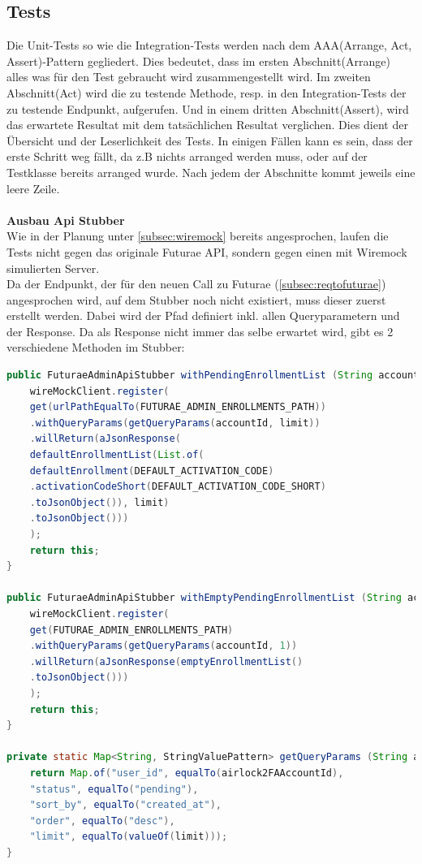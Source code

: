 \subsection{Tests}\label{subsec:testbackend}
Die Unit-Tests so wie die Integration-Tests werden nach dem AAA(Arrange, Act, Assert)-Pattern gegliedert. Dies bedeutet, dass im ersten Abschnitt(Arrange) alles was für den Test gebraucht wird zusammengestellt wird. Im zweiten Abschnitt(Act) wird die zu testende Methode, resp. in den Integration-Tests der zu testende Endpunkt, aufgerufen. Und in einem dritten Abschnitt(Assert), wird das erwartete Resultat mit dem tatsächlichen Resultat verglichen. Dies dient der Übersicht und der Leserlichkeit des Tests. In einigen Fällen kann es sein, dass der erste Schritt weg fällt, da z.B nichts arranged werden muss, oder auf der Testklasse bereits arranged wurde. Nach jedem der Abschnitte kommt jeweils eine leere Zeile. \\
\\
\textbf{Ausbau Api Stubber}\label{head:stubber}\\
Wie in der Planung unter \ref{subsec:wiremock} bereits angesprochen, laufen die Tests nicht gegen das originale Futurae API, sondern gegen einen mit Wiremock simulierten Server.\\
Da der Endpunkt, der für den neuen Call zu Futurae (\ref{subsec:reqtofuturae}) angesprochen wird, auf dem Stubber noch nicht existiert, muss dieser zuerst erstellt werden. Dabei wird der Pfad definiert inkl. allen Queryparametern und der Response. Da als Response nicht immer das selbe erwartet wird, gibt es 2 verschiedene Methoden im Stubber:
\begin{lstlisting}[language=Java]
	public FuturaeAdminApiStubber withPendingEnrollmentList (String accountId, int limit) {
	wireMockClient.register(
	get(urlPathEqualTo(FUTURAE_ADMIN_ENROLLMENTS_PATH))
	.withQueryParams(getQueryParams(accountId, limit))
	.willReturn(aJsonResponse(
	defaultEnrollmentList(List.of(
	defaultEnrollment(DEFAULT_ACTIVATION_CODE)
	.activationCodeShort(DEFAULT_ACTIVATION_CODE_SHORT)
	.toJsonObject()), limit)
	.toJsonObject()))
	);
	return this;
}

public FuturaeAdminApiStubber withEmptyPendingEnrollmentList (String accountId) {
	wireMockClient.register(
	get(FUTURAE_ADMIN_ENROLLMENTS_PATH)
	.withQueryParams(getQueryParams(accountId, 1))
	.willReturn(aJsonResponse(emptyEnrollmentList()
	.toJsonObject()))
	);
	return this;
}

private static Map<String, StringValuePattern> getQueryParams (String airlock2FAAccountId, int limit) {
	return Map.of("user_id", equalTo(airlock2FAAccountId),
	"status", equalTo("pending"),
	"sort_by", equalTo("created_at"),
	"order", equalTo("desc"),
	"limit", equalTo(valueOf(limit)));
}
\end{lstlisting}
